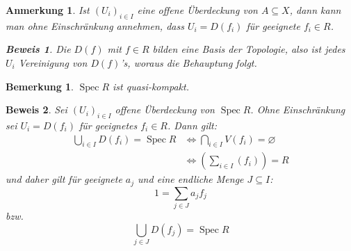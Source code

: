 \documentclass[a4paper,oneside]{scrbook}
\theoremstyle{break}
\newtheorem{Bem}[Def]{Bemerkung}
\theoremstyle{nonumberbreak}
\theoremstyle{nonumberplain}
\newtheorem{Bew}{Beweis}
\theoremstyle{break}
\newtheorem{anmerkung}{Anmerkung}
\renewcommand{\emptyset}{%
	\ensuremath{\varnothing}%
}
\newcommand{\Spec}{%
	\ensuremath{\operatorname{Spec}}%
}
\begin{document}
\begin{anmerkung}
	Ist $\left(U_i\right)_{i \in I}$ eine offene Überdeckung von $A \subseteq X$, dann kann man ohne Einschränkung annehmen, dass
	$U_i = D\left(f_i\right)$ für geeignete $f_i \in R$.
	\begin{Bew}
		Die $D\left(f\right)$ mit $f \in R$ bilden eine Basis der Topologie, also ist jedes $U_i$ Vereinigung von $D\left(f\right)$'s, woraus die Behauptung folgt.
	\end{Bew}
\end{anmerkung}



\begin{Bem}
	$\Spec R$ ist quasi-kompakt.
\end{Bem}
\begin{Bew}
	Sei $\left(U_i\right)_{i\in I}$ offene Überdeckung von $\Spec R$. 
	Ohne Einschränkung sei $U_i = D\left(f_i\right)$ für geeignetes $f_i \in R$.
	Dann gilt:
	\begin{align*}
		\bigcup_{i \in I} D\left(f_i\right) = \Spec R	& \Leftrightarrow \bigcap_{i\in I} V\left(f_i\right) = \emptyset \\
			& \Leftrightarrow \left( \sum_{i\in I} \left(f_i\right) \right) = R
	\end{align*}
	und daher gilt für geeignete $a_j$ und eine endliche Menge $J\subseteq I$:
	\[ 1 = \sum_{j \in J} a_j f_j \]
	bzw.
	\[ \bigcup_{j \in J} D\left(f_j\right) = \Spec R \]
\end{Bew}
\end{document}
